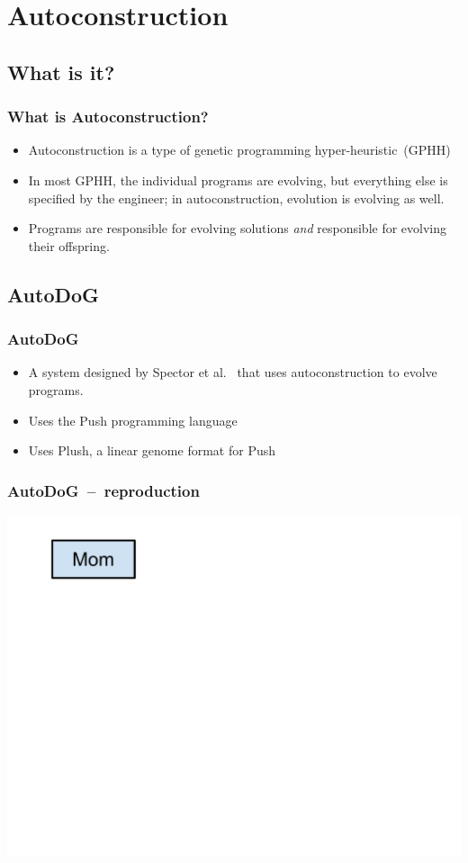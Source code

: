 \documentclass{beamer}
\newcommand{\linespace}{\vskip 0.25cm}
\begin{document}
\section[Autoconstruction]{Autoconstruction}

\subsection{What is it?}

\begin{frame}
	\frametitle{What is Autoconstruction?}
	\begin{itemize}
		\item Autoconstruction is a type of genetic programming hyper-heuristic~(GPHH)
		\linespace
		\pause
		\item In most GPHH, the individual programs are evolving, but everything else is specified by the engineer; in autoconstruction, evolution is evolving as well.
		\linespace
		\pause
		\item Programs are responsible for evolving solutions \textit{and} responsible for evolving their offspring.
	\end{itemize}
\end{frame}

\subsection{AutoDoG}

\begin{frame}
	\frametitle{AutoDoG}
	\begin{itemize}
		\item A system designed by Spector et al.~\cite{spector:2016} that uses autoconstruction to evolve programs.
		\linespace
		\pause
		\item Uses the Push programming language
		\linespace
		\pause
		\item Uses Plush, a linear genome format for Push
	\end{itemize}	
\end{frame}

\begin{frame}
	\frametitle{AutoDoG~--~reproduction}
	\includegraphics[width=.9\textwidth]{Illustrations/autodog_1.PDF}
\end{frame}
\end{document}
